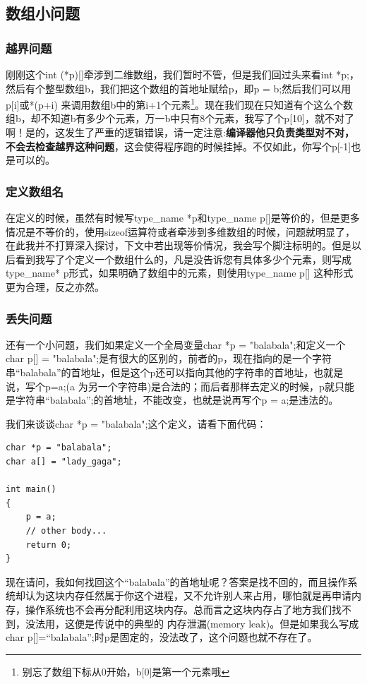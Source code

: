 \documentclass[11pt,twoside,a4paper,titlepage]{article}	%
\newcommand{\kw}[1]{\textcolor[rgb]{0.0,0.0,0.63}{ #1}}
\begin{document}
\subsection{数组小问题}

\subsubsection{越界问题}
刚刚这个int (*p)[]牵涉到二维数组，我们暂时不管，但是我们回过头来看int *p;，然后有个整型数组b，我们把这个数组的首地址赋给p，即p = b;然后我们可以用p[i]或*(p+i) 来调用数组b中的第i+1个元素\footnote{别忘了数组下标从0开始，b[0]是第一个元素哦}。现在我们现在只知道有个这么个数组b，却不知道b有多少个元素，万一b中只有8个元素，我写了个p[10]，就不对了啊！是的，这发生了严重的逻辑错误，请一定注意:\textbf{编译器他只负责类型对不对，不会去检查越界这种问题}，这会使得程序跑的时候挂掉。不仅如此，你写个p[-1]也是可以的。

\subsubsection{定义数组名}
在定义的时候，虽然有时候写type\_name *p和type\_name p[]是等价的，但是更多情况是不等价的，使用sizeof运算符或者牵涉到多维数组的时候，问题就明显了，在此我并不打算深入探讨，下文中若出现等价情况，我会写个脚注标明的。但是以后看到我写了个定义一个数组什么的，凡是没告诉您有具体多少个元素，则写成type\_name* p形式，如果明确了数组中的元素，则使用type\_name p[] 这种形式更为合理，反之亦然。

\subsubsection{丢失问题}
还有一个小问题，我们如果定义一个全局变量char *p = "balabala";和定义一个char p[] = "balabala";是有很大的区别的，前者的p，现在指向的是一个字符串“balabala”的首地址，但是这个p还可以指向其他的字符串的首地址，也就是说，写个p=a;(a 为另一个字符串)是合法的；而后者那样去定义的时候，p就只能是字符串“balabala”;的首地址，不能改变，也就是说再写个p = a;是违法的。

我们来谈谈char *p = "balabala";这个定义，请看下面代码：

\begin{lstlisting}
char *p = "balabala";
char a[] = "lady_gaga";

int main()
{
	p = a;
	// other body...
	return 0;
}
\end{lstlisting}

现在请问，我如何找回这个“balabala”的首地址呢？答案是找不回的，而且操作系统却认为这块内存任然属于你这个进程，又不允许别人来占用，哪怕就是再申请内存，操作系统也不会再分配利用这块内存。总而言之这块内存占了地方我们找不到，没法用，这便是传说中的典型的\kw{内存泄漏(memory leak)}。但是如果我么写成char p[]=“balabala”;时p是固定的，没法改了，这个问题也就不存在了。
\end{document}
